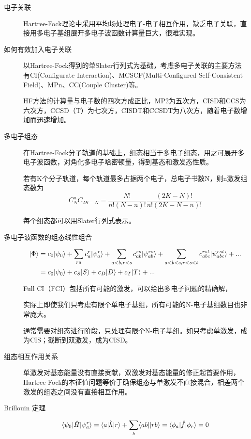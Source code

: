 \begin{description}
	\item[电子关联] Hartree-Fock理论中采用平均场处理电子-电子相互作用，缺乏电子关联，直接用多电子基组展开多电子波函数计算量巨大，很难实现。

	\item[如何有效加入电子关联] 以Hartree-Fock得到的单Slater行列式为基础，考虑多电子关联的主要方法有CI(Configurate Interaction)、MCSCF(Multi-Configured Self-Consistent Field)、MPn、CC(Couple Cluster)等。

	HF方法的计算量与电子数的四次方成正比，MP2为五次方，CISD和CCS为六次方，CCSD（T）为七次方，CISDT和CCSDT为八次方，随着电子数增加而迅速增加。

	\item[多电子组态] 在Hartree-Fock分子轨道的基础上，组态相当于多电子组态，用之可展开多电子波函数，对角化多电子哈密顿量，得到基态和激发态性质。

	若有K个分子轨道，每个轨道最多占据两个电子，总电子书数N，则n激发组态数为
	\begin{equation}
	C_N^nC_{2K-N}=\frac{N!}{n!(N-n)!}\frac{(2K-N)!}{n!(2K-N-n)!}
	\end{equation}

	每个组态都可以用Slater行列式表示。


	\item[多电子波函数的组态线性组合] 
	\begin{align*}
	| \Phi \rangle &= c_0| \psi_0 \rangle +\sum_{ra}c_a^r| \psi_a^r \rangle+\sum_{a<b,r<s}c_{ab}^{rs}| \psi_{ab}^{rs} \rangle+\sum_{a<b<c,r<s<t}c^{rst}_{abc}| \psi^{rst}_{abc} \rangle+...\\
	&=c_0| \psi_0 \rangle + c_S| S \rangle+c_D| D \rangle+c_T| T \rangle+...
	\end{align*}

	Full CI（FCI）包括所有可能的激发，可以给出多电子问题的精确解，

	实际上即使我们只考虑有限个单电子基组，所有可能的N-电子基组数目也非常庞大。

	通常需要对组态进行阶段，只处理有限个N-电子基组。如只考虑单激发，成为CIS；截断到双激发，成为CISD。
	

	\item[组态相互作用关系] 单激发对基态能量没有直接贡献，双激发对基态能量的修正起首要作用，Hartree Fock的本征值问题等价于确保组态与单激发不直接混合，相差两个激发的组态之间没有直接相互作用。

	\item[Brillouin 定理]
	\begin{equation}
	\langle \psi_0 | \hat{H} | \psi_a^r \rangle=\langle a | \hat{h} | r \rangle+\sum_b\langle ab || rb \rangle=\langle \phi_a | \hat{f} | \phi_r \rangle=0
	\end{equation}


\end{description}
